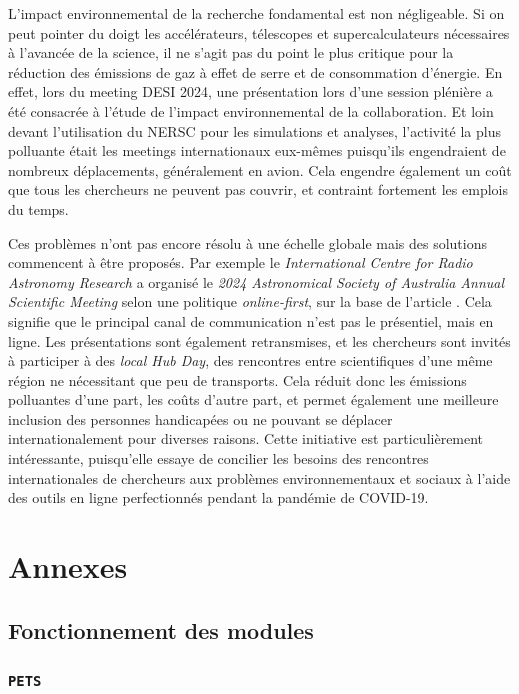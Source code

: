 \documentclass{book}
\def\pets{\texttt{PETS}\xspace}
\begin{document}
L'impact environnemental de la recherche fondamental est non négligeable. Si on peut pointer du doigt les accélérateurs, télescopes et supercalculateurs nécessaires à l'avancée de la science, il ne s'agit pas du point le plus critique pour la réduction des émissions de gaz à effet de serre et de consommation d'énergie. En effet, lors du meeting DESI 2024, une présentation lors d'une session plénière a été consacrée à l'étude de l'impact environnemental de la collaboration. Et loin devant l'utilisation du NERSC pour les simulations et analyses, l'activité la plus polluante était les meetings internationaux eux-mêmes puisqu'ils engendraient de nombreux déplacements, généralement en avion. Cela engendre également un coût que tous les chercheurs ne peuvent pas couvrir, et contraint fortement les emplois du temps.

Ces problèmes n'ont pas encore résolu à une échelle globale mais des solutions commencent à être proposés. Par exemple le \textit{International Centre for Radio Astronomy Research} a organisé le \textit{2024 Astronomical Society of Australia Annual Scientific Meeting} selon une politique \textit{online-first}, sur la base de l'article \cite{sarabipour_changing_2021}. Cela signifie que le principal canal de communication n'est pas le présentiel, mais en ligne. Les présentations sont également retransmises, et les chercheurs sont invités à participer à des \textit{local Hub Day}, des rencontres entre scientifiques d'une même région ne nécessitant que peu de transports. Cela réduit donc les émissions polluantes d'une part, les coûts d'autre part, et permet également une meilleure inclusion des personnes handicapées ou ne pouvant se déplacer internationalement pour diverses raisons. Cette initiative est particulièrement intéressante, puisqu'elle essaye de concilier les besoins des rencontres internationales de chercheurs aux problèmes environnementaux et sociaux à l'aide des outils en ligne perfectionnés pendant la pandémie de COVID-19.



\appendix
\chapter{Annexes}

\section{Fonctionnement des modules}

\subsection{\pets}
\label{anx:pets}
\end{document}
